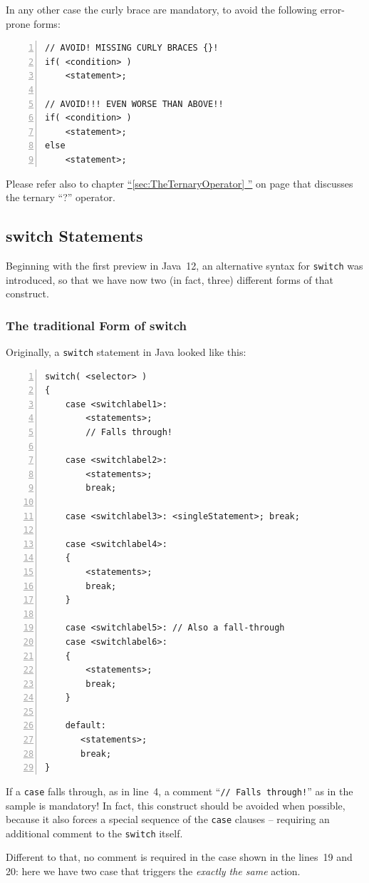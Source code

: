 \documentclass[12pt,a4paper,titlepage, parskip=half, headsepline, footsepline, cleardoubleplain]{scrbook}
\newcommand*{\tqfullvref}[1]{\hyperref[{#1}]{“\ref*{#1} \nameref*{#1}”} on page \pageref{#1}}
\begin{document}
In any other case the curly brace are mandatory, to avoid the following error-prone forms:

\begin{lstlisting}[numbers=left]
// AVOID! MISSING CURLY BRACES {}!
if( <condition> )
    <statement>;

// AVOID!!! EVEN WORSE THAN ABOVE!!    
if( <condition> )
    <statement>;
else
    <statement>;
\end{lstlisting}

Please refer also to chapter \tqfullvref{sec:TheTernaryOperator} that discusses the ternary “?” operator.


\subsection{switch Statements}\label{sec:SwitchStatements}
Beginning with the first preview in Java~12, an alternative syntax for \lstinline|switch| was introduced, so that we have now two (in fact, three) different forms of that construct.

\subsubsection{The traditional Form of switch}
Originally, a \lstinline|switch| statement in Java looked like this:
\begin{lstlisting}[numbers=left]
switch( <selector> )
{
    case <switchlabel1>:
        <statements>;
        // Falls through!

    case <switchlabel2>:
        <statements>;
        break;

    case <switchlabel3>: <singleStatement>; break;

    case <switchlabel4>:
    {
        <statements>;
        break;
    }

    case <switchlabel5>: // Also a fall-through
    case <switchlabel6>:
    {
        <statements>;
        break;
    }

    default:
       <statements>;
       break;
}
\end{lstlisting}

If a \lstinline|case| falls through, as in line~4, a comment “\lstinline|// Falls through!|” as in the sample is mandatory! In fact, this construct should be avoided when possible, because it also forces a special sequence of the \lstinline|case| clauses – requiring an additional comment to the \lstinline|switch| itself.

Different to that, no comment is required in the case shown in the lines~19 and 20: here we have two case that triggers the \textit{exactly the same} action.
\end{document}
